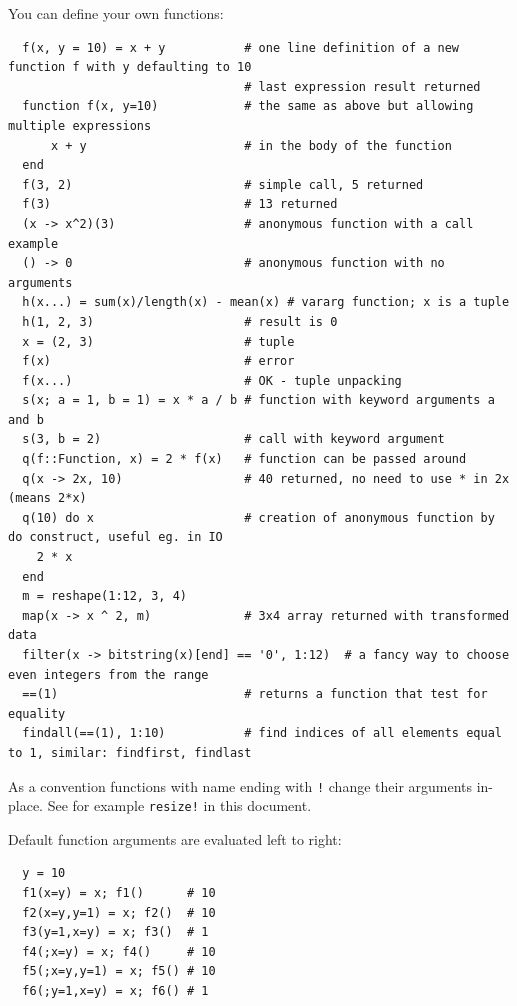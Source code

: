 \documentclass[10pt,a4paper]{article}
\begin{document}
You can define your own functions:
\begin{lstlisting}
  f(x, y = 10) = x + y           # one line definition of a new function f with y defaulting to 10
                                 # last expression result returned
  function f(x, y=10)            # the same as above but allowing multiple expressions
      x + y                      # in the body of the function
  end
  f(3, 2)                        # simple call, 5 returned
  f(3)                           # 13 returned
  (x -> x^2)(3)                  # anonymous function with a call example
  () -> 0                        # anonymous function with no arguments
  h(x...) = sum(x)/length(x) - mean(x) # vararg function; x is a tuple
  h(1, 2, 3)                     # result is 0
  x = (2, 3)                     # tuple
  f(x)                           # error
  f(x...)                        # OK - tuple unpacking
  s(x; a = 1, b = 1) = x * a / b # function with keyword arguments a and b
  s(3, b = 2)                    # call with keyword argument
  q(f::Function, x) = 2 * f(x)   # function can be passed around
  q(x -> 2x, 10)                 # 40 returned, no need to use * in 2x (means 2*x)
  q(10) do x                     # creation of anonymous function by do construct, useful eg. in IO
    2 * x
  end
  m = reshape(1:12, 3, 4)
  map(x -> x ^ 2, m)             # 3x4 array returned with transformed data
  filter(x -> bitstring(x)[end] == '0', 1:12)  # a fancy way to choose even integers from the range
  ==(1)                          # returns a function that test for equality
  findall(==(1), 1:10)           # find indices of all elements equal to 1, similar: findfirst, findlast
\end{lstlisting}

As a convention functions with name ending with \lstinline|!| change their arguments in-place. See for example \lstinline|resize!| in this document.

Default function arguments are evaluated left to right:
\begin{lstlisting}
  y = 10
  f1(x=y) = x; f1()      # 10
  f2(x=y,y=1) = x; f2()  # 10
  f3(y=1,x=y) = x; f3()  # 1
  f4(;x=y) = x; f4()     # 10
  f5(;x=y,y=1) = x; f5() # 10
  f6(;y=1,x=y) = x; f6() # 1
\end{lstlisting}
\end{document}
